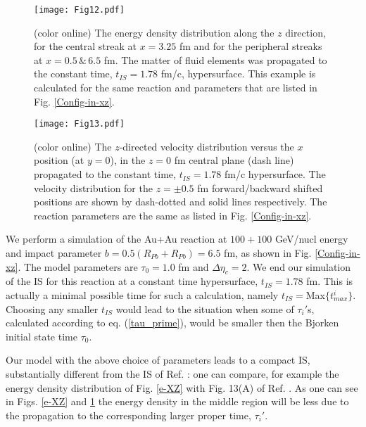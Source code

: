 \documentclass[aps,prc,twocolumn,floatfix,showpacs,a4paper,
nofootinbib,amsmath,amssymb]{revtex4-1}
\begin{document}
\begin{figure}[htb]     %
\begin{center}
\resizebox{1.01\columnwidth}{!}
{\texttt{[image: Fig12.pdf]}}
\caption{ (color online)
The energy density distribution along the $z$ direction, for the 
central streak at $x = 3.25$ fm and for the peripheral streaks at
$x = 0.5 \, \& \, 6.5$ fm.
The matter of fluid elements was propagated to the constant time, 
$t_{IS} = 1.78$ fm/c, hypersurface. 
This example is calculated for the same reaction and parameters 
that are listed in Fig. \ref{Config-in-xz}.
}
\label{finez}
\end{center}
\end{figure}        %



\begin{figure}[htb]     %
\begin{center}
\resizebox{1.01\columnwidth}{!}
{\texttt{[image: Fig13.pdf]}}
\caption{ (color online)
The $z$-directed velocity distribution versus the $x$ position 
(at $y = 0$), in the $z = 0$ fm
central plane (dash line)
propagated to the constant time, $t_{IS} = 1.78$ fm/c
hypersurface. 
The velocity distribution for the 
$z = \pm 0.5$ fm forward/backward shifted positions 
are shown by dash-dotted and solid lines respectively.
The reaction parameters are the same as listed in Fig. \ref{Config-in-xz}.
}
\label{finvx}
\end{center}
\end{figure}        %





We perform a simulation of the 
Au+Au reaction at $100+100$ GeV/nucl energy and impact parameter
$b= 0.5 (R_{Pb} + R_{Pb}) = 6.5$ fm, as shown in Fig. \ref{Config-in-xz}.  The model parameters are $\tau_0=1.0$ fm  and $\Delta \eta_c = 2$.
We end our simulation of the IS for this reaction at a constant time hypersurface, $t_{IS} = 1.78$ fm. This is actually a minimal possible time for such a calculation, namely $t_{IS}=$Max$\{t_{max}^i\}$. Choosing any smaller $t_{IS}$ would lead to the situation  when some of $\tau_i '$s, calculated according to eq. (\ref{tau_prime}), would be smaller then the Bjorken initial state time $\tau_0$. 

Our model with the above choice of parameters leads to a compact IS, substantially different from the IS of Ref. \cite{M2001, M2002}: one can compare, for example the energy density distribution of Fig. \ref{e-XZ} with Fig. 13(A) of Ref. \cite{M2002}.    As one can see in Figs. \ref{e-XZ} and \ref{finez} the energy density in the middle region will be less due to the propagation to the corresponding larger proper time, $\tau_i '$. 
\end{document}
